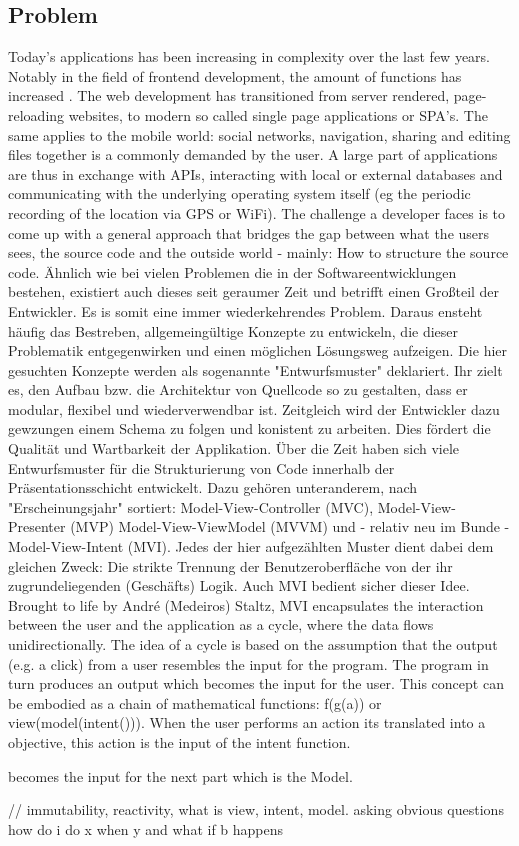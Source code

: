\subsection{Problem}
\label{subsec:problem}

Today's applications has been increasing in complexity over the last few years.
Notably in the field of frontend development, the amount of functions has increased \cite{kevin2018}. The web development has transitioned from server rendered, 
page-reloading websites, to modern so called single page applications or SPA's.
The same applies to the mobile world: social networks, navigation, sharing and editing files together is a commonly demanded by the user.
A large part of applications are thus in exchange with APIs, interacting with local or external databases
and communicating with the underlying operating system itself (eg the periodic recording of the location via GPS or WiFi).
The challenge a developer faces is to come up with a general approach that bridges the gap between what the users sees, the source code
and the outside world - mainly: How to structure the source code. Ähnlich wie bei vielen Problemen die in der Softwareentwicklungen bestehen, existiert 
auch dieses seit geraumer Zeit und betrifft einen Großteil der Entwickler. Es is somit eine immer wiederkehrendes Problem. Daraus ensteht häufig das Bestreben, 
allgemeingültige Konzepte zu entwickeln, die dieser Problematik entgegenwirken und einen möglichen Lösungsweg aufzeigen. Die hier gesuchten Konzepte werden
als sogenannte "Entwurfsmuster" deklariert. Ihr zielt es, den Aufbau bzw. die Architektur von Quellcode so zu gestalten, dass er modular, flexibel und
wiederverwendbar ist. Zeitgleich wird der Entwickler dazu gewzungen einem Schema zu folgen und konistent zu arbeiten. Dies fördert die Qualität und
Wartbarkeit der Applikation. Über die Zeit haben sich viele Entwurfsmuster für die Strukturierung von Code innerhalb der Präsentationsschicht entwickelt. 
Dazu gehören unteranderem, nach "Erscheinungsjahr" sortiert: Model-View-Controller (MVC), Model-View-Presenter (MVP) Model-View-ViewModel (MVVM) und - relativ 
neu im Bunde - Model-View-Intent (MVI). Jedes der hier aufgezählten Muster dient dabei dem gleichen Zweck: Die strikte Trennung der Benutzeroberfläche von der ihr 
zugrundeliegenden (Geschäfts) Logik.
Auch MVI bedient sicher dieser Idee.
Brought to life by André (Medeiros) Staltz, MVI encapsulates the interaction between the user and the application as a cycle, where the data flows unidirectionally.
The idea of a cycle is based on the assumption that the output (e.g. a click) from a user resembles the input for the program. The program in turn produces an output 
which becomes the input for the user. This concept can be embodied as a chain of mathematical functions: f(g(a)) or view(model(intent())).
When the user performs an action its translated into a objective, this action is the input of the intent function.

becomes the input for the next part which is the Model.

// immutability, reactivity, what is view, intent, model. asking obvious questions how do i do x when y and what if b happens
